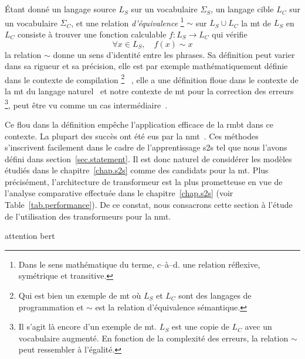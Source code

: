 \section{}

Étant donné un langage source \(L_S\) sur un vocabulaire \(\Sigma_S\),
un langage cible \(L_C\) sur un vocabulaire \(\Sigma_C\),
et une relation \emph{d'équivalence}%
\footnote{Dans le sens mathématique du terme, c--à--d. une relation réflexive, symétrique et transitive.} %
\(\sim\) sur \(L_S \cup L_C\) %
la \gls{mt} de \(L_S\) en \(L_C\) consiste à trouver une fonction calculable \(f : L_S \rightarrow L_C\)
qui vérifie 
\begin{equation}
    \label{eq:mt-equivalence}
    \forall x \in L_S, \quad f(x) \sim x
\end{equation}
la relation \(\sim\) donne un sens d'identité entre les phrases.
Sa définition peut varier dans sa rigueur et sa précision,
elle est par exemple mathématiquement définie dans le contexte de compilation%
\footnote{Qui est bien un exemple de \gls{mt} où \(L_S\) et \(L_C\) sont des langages de programmation
et \(\sim\) est la relation d'équivalence sémantique.}%
~\cite{Hadj_2015},
elle a une définition floue dans le contexte de la \gls{mt} du langage naturel~\cite{routledge}
et notre contexte de \gls{mt} pour la correction des erreurs%
\footnote{%
    Il s'agit là encore d'un exemple de \gls{mt}. \(L_S\) est une copie de \(L_C\) avec un vocabulaire augmenté.
    En fonction de la complexité des erreurs, la relation \(\sim\) peut ressembler à l'égalité.
}, %
peut être vu comme un cas intermédiaire~\cite{Bryant_Yuan_Qorib_Cao_Ng_Briscoe_2022}.

Ce flou dans la définition empêche l'application efficace de la \gls{rmbt} dans ce contexte.
La plupart des succès ont été eus par la \gls{nmt}~\cite{deep-nmt-survey}.
Ces méthodes s'inscrivent facilement dans le cadre de l'apprentissage \gls{s2s} 
tel que nous l'avons défini dans section~\ref{sec.statement}.
Il est donc naturel de considérer les modèles étudiés dans le chapitre~\ref{chap.s2s} 
comme des candidats pour la \gls{mt}.
Plus précisément, l'architecture de transformeur est la plus prometteuse en vue de l'analyse comparative
effectuée dans le chapitre~\ref{chap.s2s} (voir Table~\ref{tab.performance}).
De ce constat, nous consacrons cette section à l'étude de l'utilisation des transformeurs pour la \gls{nmt}.

{attention}
{bert}